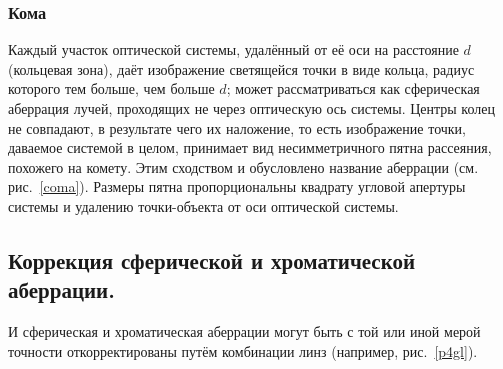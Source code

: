 \subsubsection{Кома}
Каждый участок оптической системы, удалённый от её оси на расстояние $d$ (кольцевая зона), даёт изображение светящейся точки в виде кольца, радиус которого тем больше, чем больше $d$; может рассматриваться как сферическая аберрация лучей, проходящих не через оптическую ось системы. Центры колец не совпадают, в результате чего их наложение, то есть изображение точки, даваемое системой в целом, принимает вид несимметричного пятна рассеяния, похожего на комету. Этим сходством и обусловлено название аберрации (см. рис.~\ref{coma}). Размеры пятна пропорциональны квадрату угловой апертуры системы и удалению точки-объекта от оси оптической системы. 
\subsection{Коррекция сферической и хроматической аберрации.}
И сферическая и хроматическая аберрации могут быть с той или иной мерой точности откорректированы путём комбинации линз (например, рис.~\ref{p4gl}).
